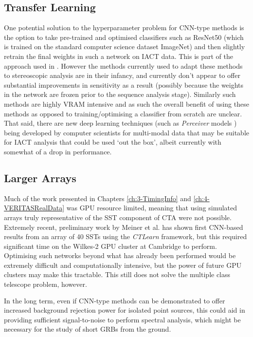 \subsection{Transfer Learning}
One potential solution to the hyperparameter problem for CNN-type methods is the option to take pre-trained and optimised classifiers such as ResNet50 \cite{resnet50} (which is trained on the standard computer science dataset ImageNet) and then slightly retrain the final weights in such a network on IACT data. This is part of the approach used in \cite{tjarkicrc}. However the methods currently used to adapt these methods to stereoscopic analysis are in their infancy, and currently don't appear to offer substantial improvements in sensitivity as a result (possibly because the weights in the network are frozen prior to the sequence analysis stage). Similarly such methods are highly VRAM intensive and as such the overall benefit of using these methods as opposed to training/optimising a classifier from scratch are unclear. That said, there are new deep learning techniques (such as \textit{Perceiver} models \cite{perceiver}) being developed by computer scientists for multi-modal data that may be suitable for IACT analysis that could be used `out the box', albeit currently with somewhat of a drop in performance.


\subsection{Larger Arrays}
Much of the work presented in Chapters \ref{ch:3-TimingInfo} and \ref{ch:4-VERITASRealData} was GPU resource limited, meaning that using simulated arrays truly representative of the SST component of CTA were not possible. Extremely recent, preliminary work by Meiner et al. \cite{tjarkicrc} has shown first CNN-based results from an array of 40 SSTs using the \textit{CTLearn} framework, but this required significant time on the Wilkes-2 GPU cluster at Cambridge to perform. Optimising such networks beyond what has already been performed would be extremely difficult and computationally intensive, but the power of future GPU clusters may make this tractable. This still does not solve the multiple class telescope problem, however.

In the long term, even if CNN-type methods can be demonstrated to offer increased background rejection power for isolated point sources, this could aid in providing sufficient signal-to-noise to perform spectral analysis, which might be necessary for the study of short GRBs from the ground.